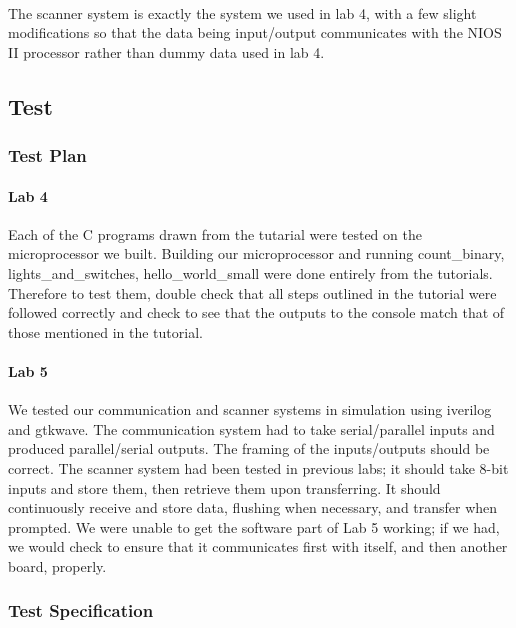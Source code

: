 \documentclass{article}
\begin{document}
    \paragraph{} The scanner system is exactly the system we used in lab 4, with a few slight modifications so that the data being input/output communicates with the NIOS II processor rather than dummy data used in lab 4.


  \subsection{Test}
    \subsubsection{Test Plan}
    \paragraph{Lab 4} Each of the C programs drawn from the tutarial were tested on the microprocessor we built. Building our microprocessor and running count\_binary, lights\_and\_switches, hello\_world\_small were done entirely from the tutorials. Therefore to test them, double check that all steps outlined in the tutorial were followed correctly and check to see that the outputs to the console match that of those mentioned in the tutorial.

    \paragraph{Lab 5} We tested our communication and scanner systems in simulation using iverilog and gtkwave. The communication system had to take serial/parallel inputs and produced parallel/serial outputs. The framing of the inputs/outputs should be correct. The scanner system had been tested in previous labs; it should take 8-bit inputs and store them, then retrieve them upon transferring. It should continuously receive and store data, flushing when necessary, and transfer when prompted. We were unable to get the software part of Lab 5 working; if we had, we would check to ensure that it communicates first with itself, and then another board, properly.

    \subsubsection{Test Specification}
\end{document}
